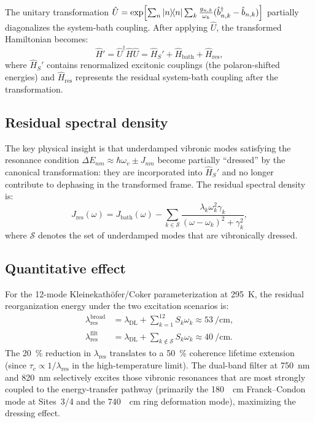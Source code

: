 \documentclass[11pt,a4paper]{article}
\begin{document}
The unitary transformation $\hat{U} = \exp\!\left[\sum_n \dyad{n} \sum_k \frac{g_{n,k}}{\omega_k}(\hat{b}_{n,k}^\dagger - \hat{b}_{n,k})\right]$ partially diagonalizes the system-bath coupling.
After applying $\hat{U}$, the transformed Hamiltonian becomes:
\begin{equation}
\hat{H}' = \hat{U}^\dagger \hat{H} \hat{U} = \hat{H}_S' + \hat{H}_{\mathrm{bath}} + \hat{H}_{\mathrm{res}},
\label{eq:SI_lf_hamiltonian}
\end{equation}
where $\hat{H}_S'$ contains renormalized excitonic couplings (the polaron-shifted energies) and $\hat{H}_{\mathrm{res}}$ represents the residual system-bath coupling after the transformation.

\subsection{Residual spectral density}

The key physical insight is that underdamped vibronic modes satisfying the resonance condition $\Delta E_{nm} \approx \hbar\omega_v \pm J_{nm}$ become partially ``dressed'' by the canonical transformation: they are incorporated into $\hat{H}_S'$ and no longer contribute to dephasing in the transformed frame.
The residual spectral density is:
\begin{equation}
J_{\mathrm{res}}(\omega) = J_{\mathrm{bath}}(\omega) - \sum_{k \in \mathcal{S}} \frac{\lambda_k \omega_k^2 \gamma_k}{(\omega - \omega_k)^2 + \gamma_k^2},
\label{eq:SI_residual_spectral}
\end{equation}
where $\mathcal{S}$ denotes the set of underdamped modes that are vibronically dressed.

\subsection{Quantitative effect}

For the 12-mode Kleinekath\"{o}fer/Coker parameterization at \qty{295}{\kelvin}, the residual reorganization energy under the two excitation scenarios is:
\begin{align}
\lambda_{\mathrm{res}}^{\mathrm{broad}} &= \lambda_{\mathrm{DL}} + \sum_{k=1}^{12} S_k \omega_k \approx \qty{53}{\per\cm}, \label{eq:SI_lambda_broad} \\
\lambda_{\mathrm{res}}^{\mathrm{filt}} &= \lambda_{\mathrm{DL}} + \sum_{k \notin \mathcal{S}} S_k \omega_k \approx \qty{40}{\per\cm}. \label{eq:SI_lambda_filt}
\end{align}
The \qty{20}{\percent} reduction in $\lambda_{\mathrm{res}}$ translates to a \qty{50}{\percent} coherence lifetime extension (since $\tau_c \propto 1/\lambda_{\mathrm{res}}$ in the high-temperature limit).
The dual-band filter at \qty{750}{\nm} and \qty{820}{\nm} selectively excites those vibronic resonances that are most strongly coupled to the energy-transfer pathway (primarily the \qty{180}{\per\cm} Franck--Condon mode at Sites~3/4 and the \qty{740}{\per\cm} ring deformation mode), maximizing the dressing effect.
\end{document}
